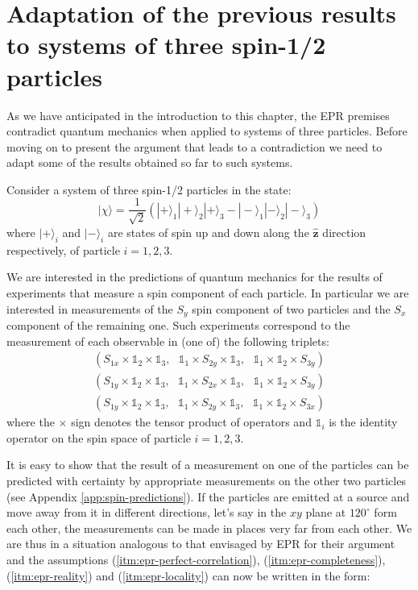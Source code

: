 \section{Adaptation of the previous results to systems of three spin-1/2 particles}
\label{sec:adaptation-to-3-particles}
As we have anticipated in the introduction to this chapter, the EPR premises contradict quantum mechanics when applied to systems of three particles. Before moving on to present the argument that leads to a contradiction we need to adapt some of the results obtained so far to such systems.

Consider a system of three spin-1/2 particles in the state:
\begin{equation}
  |\chi\rangle = \frac{1}{\sqrt{2}} \left( |+\rangle_1 |+\rangle_2 |+\rangle_3 - |-\rangle_1 |-\rangle_2 |-\rangle_3 \right)
  \label{eq:ghz-state}
\end{equation}
where $|+\rangle_i$ and $|-\rangle_i$ are states of spin up and down along the $\mathbf{\hat{z}
}$ direction respectively, of particle $i = 1, 2, 3$. 

We are interested in the predictions of quantum mechanics for the results of experiments that measure a spin component of each particle. In particular we are interested in measurements of the $S_y$ spin component of two particles and the $S_x$ component of the remaining one. Such experiments correspond to the measurement of each observable in (one of) the following triplets:
\begin{equation}
  \begin{split}
    \left( S_{1x} \times \mathbb{1}_2 \times \mathbb{1}_3,~~~ \mathbb{1}_1 \times S_{2y} \times \mathbb{1}_3,~~~ \mathbb{1}_1 \times \mathbb{1}_2 \times S_{3y} \right)\\
    \left( S_{1y} \times \mathbb{1}_2 \times \mathbb{1}_3,~~~ \mathbb{1}_1 \times S_{2x} \times \mathbb{1}_3,~~~ \mathbb{1}_1 \times \mathbb{1}_2 \times S_{3y} \right)\\
    \left( S_{1y} \times \mathbb{1}_2 \times \mathbb{1}_3,~~~ \mathbb{1}_1 \times S_{2y} \times \mathbb{1}_3,~~~ \mathbb{1}_1 \times \mathbb{1}_2 \times S_{3x} \right)
  \end{split}
  \label{eq:xyy-observables-triplets}
\end{equation}
where the $\times$ sign denotes the tensor product of operators and $\mathbb{1}_i$ is the identity operator on the spin space of particle $i = 1, 2, 3$.

It is easy to show that the result of a measurement on one of the particles can be predicted with certainty by appropriate measurements on the other two particles (see Appendix \ref{app:spin-predictions}). If the particles are emitted at a source and move away from it in different directions, let's say in the $xy$ plane at $120^{\circ}$ form each other, the measurements can be made in places very far from each other. We are thus in a situation analogous to that envisaged by EPR for their argument and the assumptions (\ref{itm:epr-perfect-correlation}), (\ref{itm:epr-completeness}), (\ref{itm:epr-reality}) and (\ref{itm:epr-locality}) can now be written in the form:%

